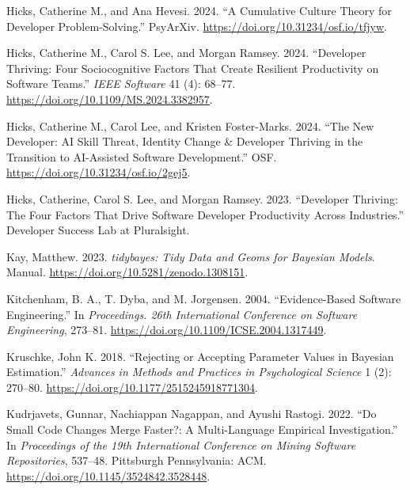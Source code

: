\documentclass[
]{article}
\newlength{\cslhangindent}
\newenvironment{CSLReferences}[2] %
 {\begin{list}{}{%
  \setlength{\itemindent}{0pt}
  \setlength{\leftmargin}{0pt}
  \setlength{\parsep}{0pt}
  \ifodd #1
   \setlength{\leftmargin}{\cslhangindent}
   \setlength{\itemindent}{-1\cslhangindent}
  \fi
  \setlength{\itemsep}{#2\baselineskip}}}
 {\end{list}}
\begin{document}
\begin{CSLReferences}{1}{0}
Hicks, Catherine M., and Ana Hevesi. 2024. {``A {Cumulative Culture
Theory} for {Developer Problem-Solving}.''} PsyArXiv.
\url{https://doi.org/10.31234/osf.io/tfjyw}.

Hicks, Catherine M., Carol S. Lee, and Morgan Ramsey. 2024. {``Developer
{Thriving}: {Four Sociocognitive Factors That Create Resilient
Productivity} on {Software Teams}.''} \emph{IEEE Software} 41 (4):
68--77. \url{https://doi.org/10.1109/MS.2024.3382957}.

Hicks, Catherine M., Carol Lee, and Kristen Foster-Marks. 2024. {``The
{New Developer}: {AI Skill Threat}, {Identity Change} \& {Developer
Thriving} in the {Transition} to {AI-Assisted Software Development}.''}
OSF. \url{https://doi.org/10.31234/osf.io/2gej5}.

Hicks, Catherine, Carol S. Lee, and Morgan Ramsey. 2023. {``Developer
{Thriving}: {The} Four Factors That Drive {Software Developer
Productivity} Across {Industries}.''} Developer Success Lab at
Pluralsight.

Kay, Matthew. 2023. \emph{{tidybayes}: {Tidy} Data and Geoms for
{Bayesian} Models}. Manual.
\url{https://doi.org/10.5281/zenodo.1308151}.

Kitchenham, B. A., T. Dyba, and M. Jorgensen. 2004. {``Evidence-Based
Software Engineering.''} In \emph{Proceedings. 26th {International
Conference} on {Software Engineering}}, 273--81.
\url{https://doi.org/10.1109/ICSE.2004.1317449}.

Kruschke, John K. 2018. {``Rejecting or {Accepting Parameter Values} in
{Bayesian Estimation}.''} \emph{Advances in Methods and Practices in
Psychological Science} 1 (2): 270--80.
\url{https://doi.org/10.1177/2515245918771304}.

Kudrjavets, Gunnar, Nachiappan Nagappan, and Ayushi Rastogi. 2022. {``Do
Small Code Changes Merge Faster?: A Multi-Language Empirical
Investigation.''} In \emph{Proceedings of the 19th {International
Conference} on {Mining Software Repositories}}, 537--48. Pittsburgh
Pennsylvania: ACM. \url{https://doi.org/10.1145/3524842.3528448}.


\end{CSLReferences}
\end{document}
